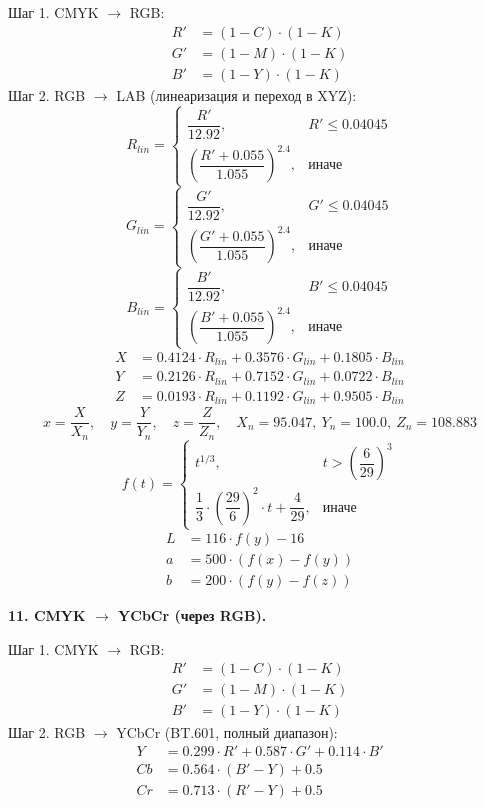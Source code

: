 \documentclass[12pt,a4paper]{article}
\begin{document}
Шаг 1. CMYK \(\to\) RGB:
\begin{align*}
R' &= (1 - C) \cdot (1 - K) \\
G' &= (1 - M) \cdot (1 - K) \\
B' &= (1 - Y) \cdot (1 - K)
\end{align*}
Шаг 2. RGB \(\to\) LAB (линеаризация и переход в XYZ):
\[
R_{lin} = \begin{cases} \dfrac{R'}{12.92}, & R' \le 0.04045 \\[8pt] \left( \dfrac{R' + 0.055}{1.055} \right)^{2.4}, & \text{иначе} \end{cases}
\]
\[
G_{lin} = \begin{cases} \dfrac{G'}{12.92}, & G' \le 0.04045 \\[8pt] \left( \dfrac{G' + 0.055}{1.055} \right)^{2.4}, & \text{иначе} \end{cases}
\]
\[
B_{lin} = \begin{cases} \dfrac{B'}{12.92}, & B' \le 0.04045 \\[8pt] \left( \dfrac{B' + 0.055}{1.055} \right)^{2.4}, & \text{иначе} \end{cases}
\]
\begin{align*}
X &= 0.4124 \cdot R_{lin} + 0.3576 \cdot G_{lin} + 0.1805 \cdot B_{lin} \\
Y &= 0.2126 \cdot R_{lin} + 0.7152 \cdot G_{lin} + 0.0722 \cdot B_{lin} \\
Z &= 0.0193 \cdot R_{lin} + 0.1192 \cdot G_{lin} + 0.9505 \cdot B_{lin}
\end{align*}
\[
x = \frac{X}{X_n},\quad y = \frac{Y}{Y_n},\quad z = \frac{Z}{Z_n},\quad X_n = 95.047,\ Y_n = 100.0,\ Z_n = 108.883
\]
\[
f(t) = \begin{cases} t^{1/3}, & t > \left(\dfrac{6}{29}\right)^3 \\[8pt] \dfrac{1}{3} \cdot \left(\dfrac{29}{6}\right)^2 \cdot t + \dfrac{4}{29}, & \text{иначе} \end{cases}
\]
\begin{align*}
L &= 116 \cdot f(y) - 16 \\
a &= 500 \cdot (f(x) - f(y)) \\
b &= 200 \cdot (f(y) - f(z))
\end{align*}

\textbf{11. CMYK \(\to\) YCbCr (через RGB).}

Шаг 1. CMYK \(\to\) RGB:
\begin{align*}
R' &= (1 - C) \cdot (1 - K) \\
G' &= (1 - M) \cdot (1 - K) \\
B' &= (1 - Y) \cdot (1 - K)
\end{align*}
Шаг 2. RGB \(\to\) YCbCr (BT.601, полный диапазон):
\begin{align*}
Y &= 0.299 \cdot R' + 0.587 \cdot G' + 0.114 \cdot B' \\
Cb &= 0.564 \cdot (B' - Y) + 0.5 \\
Cr &= 0.713 \cdot (R' - Y) + 0.5
\end{align*}
\end{document}
